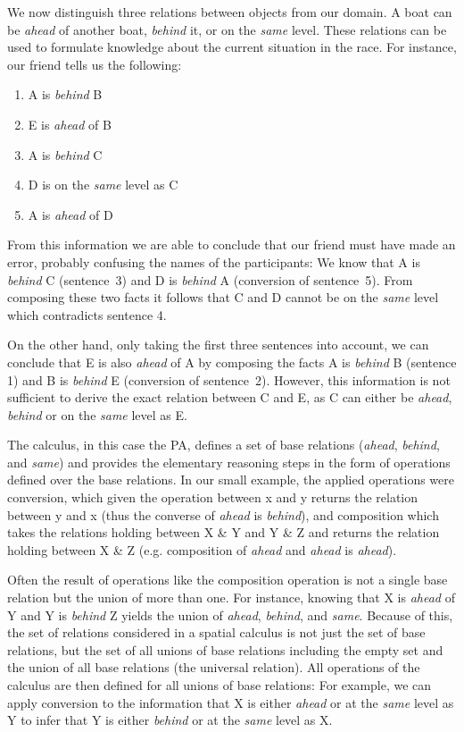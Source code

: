 \documentclass[headsepline]{scrreprt}
\theoremstyle{definition}
\begin{document}
We now distinguish three relations between objects from
our domain. A boat can be \emph{ahead} of another boat, \emph{behind} it,
or on the \emph{same} level. These relations can be used to formulate
knowledge about the current situation in the race. For instance, our
friend tells us the following:

\begin{enumerate}
\item A is \emph{behind} B
\item E is \emph{ahead} of B
\item A is \emph{behind} C
\item D is on the \emph{same} level as C
\item A is \emph{ahead} of D
\end{enumerate}
From this information we are able to conclude that our friend must have
made an error, probably confusing the names of the participants: We know
that A is \emph{behind} C (sentence~3) and D is \emph{behind} A (conversion of sentence~5). From
composing these two facts it follows that C and D cannot be on the \emph{same}
level which contradicts sentence 4.

On the other hand, only taking the first three sentences into account, we can conclude that E
is also \emph{ahead} of A by composing
the facts A is \emph{behind} B (sentence 1) and B is \emph{behind} E (conversion of sentence~2).
However, this information is not sufficient to derive the exact
relation
between C and E, as C can either be \emph{ahead}, \emph{behind} or on the {\em
same} level as E.

The calculus, in this case the PA, defines a set of base relations
(\emph{ahead}, \emph{behind}, and \emph{same}) and
provides the elementary reasoning steps in the form of operations defined
over the base relations. In our small example, the applied
operations were conversion, which given the operation between x and y returns
the relation between y and x (thus the converse of \emph{ahead} is
\emph{behind}), and composition which takes the relations holding
between X \& Y and Y \& Z and returns the relation holding between X \& Z (e.g.
composition of \emph{ahead} and \emph{ahead} is \emph{ahead}).

Often the result of operations like the composition operation is
not a single base relation but the union of more than one. For
instance, knowing that X is \emph{ahead} of Y and Y is \emph{behind}
Z yields the union of \emph{ahead}, \emph{behind}, and \emph{same}.
Because of this, the set of relations considered in a spatial
calculus is not just the set of base relations, but the set
of all unions of base relations including the empty set and
the union of all base relations (the universal relation).
All operations of the calculus are then defined for all unions
of base relations: For example, we can apply conversion to
the information that X is either \emph{ahead} or at the
\emph{same} level as Y to infer that Y is either \emph{behind}
or at the \emph{same} level as X.
\end{document}
